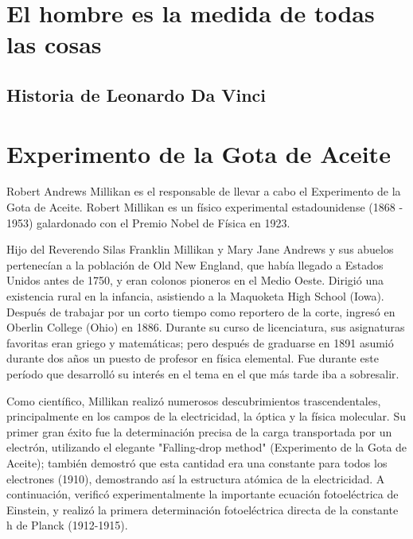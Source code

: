 \documentclass[letterpaper, 10pt, journal]{IEEEtran}
\begin{document}
\section{El hombre es la medida de todas las cosas}

\subsection{Historia de Leonardo Da Vinci}

\section{Experimento de la Gota de Aceite}
Robert Andrews Millikan es el responsable de llevar a cabo el Experimento de la Gota de Aceite. Robert Millikan es un físico experimental estadounidense (1868 - 1953) galardonado con el Premio Nobel de Física en 1923. 

Hijo del Reverendo Silas Franklin Millikan y Mary Jane Andrews y sus abuelos pertenecían a la población de Old New England, que había llegado a Estados Unidos antes de 1750, y eran colonos pioneros en el Medio Oeste. Dirigió una existencia rural en la infancia, asistiendo a la Maquoketa High School (Iowa). Después de trabajar por un corto tiempo como reportero de la corte, ingresó en Oberlin College (Ohio) en 1886. Durante su curso de licenciatura, sus asignaturas favoritas eran griego y matemáticas; pero después de graduarse en 1891 asumió durante dos años un puesto de profesor en física elemental. Fue durante este período que desarrolló su interés en el tema en el que más tarde iba a sobresalir.

Como científico, Millikan realizó numerosos descubrimientos trascendentales, principalmente en los campos de la electricidad, la óptica y la física molecular. Su primer gran éxito fue la determinación precisa de la carga transportada por un electrón, utilizando el elegante "Falling-drop method" (Experimento de la Gota de Aceite); también demostró que esta cantidad era una constante para todos los electrones (1910), demostrando así la estructura atómica de la electricidad. A continuación, verificó experimentalmente la importante ecuación fotoeléctrica de Einstein, y realizó la primera determinación fotoeléctrica directa de la constante h de Planck (1912-1915).
\end{document}
